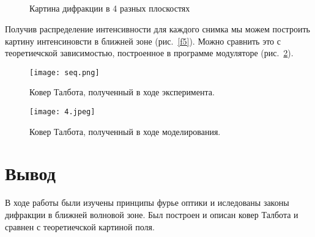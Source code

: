 \documentclass{urticle}
\begin{document}
    \begin{figure}[H]
        \begin{minipage}[h]{0.2\linewidth}
             \\
        \end{minipage}
        \hfill
        \begin{minipage}[h]{0.2\linewidth}
             \\
        \end{minipage}
        \hfill
        \begin{minipage}[h]{0.2\linewidth}
             \\
        \end{minipage}
        \hfill
        \begin{minipage}[h]{0.2\linewidth}    
             \\
        \end{minipage}
        \caption{Картина дифракции в 4 разных плоскостях}
        \label{f4}
    \end{figure}

    Получив распределение интенсивности для каждого снимка мы можем построить картину интенсиновсти в ближней зоне (рис.~\ref{f5}). Можно сравнить это с теоретиечской зависимостью, построенное в программе модуляторе (рис.~\ref{f6}).
    
    \begin{figure}[H]
        \begin{center}
        \begin{minipage}[h]{0.9\linewidth}
            \texttt{[image: seq.png]}
            \caption{Ковер Талбота, полученный в ходе эксперимента.}
            \label{f5}
        \end{minipage}
        \hfill 
        \begin{minipage}[h]{0.4\linewidth}
            \texttt{[image: 4.jpeg]}
            \caption{Ковер Талбота, полученный в ходе моделирования.}
            \label{f6}
        \end{minipage}
        \end{center}
    \end{figure}


\section{Вывод}
    В ходе работы были изучены принципы фурье оптики и иследованы законы дифракции в ближней волновой зоне. Был построен и описан ковер Талбота и сравнен с теоретиечской картиной поля.
\end{document}
